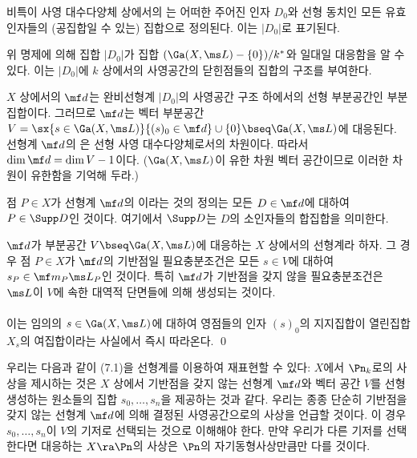 	
	\begin{definition}
	비특이 사영 대수다양체 상에서의 는
	어떠한 주어진 인자 $D_0$와 선형 동치인 모든 유효인자들의 (공집합일 수 있는) 집합으로 정의된다. 이는 $|D_0|$로 표기된다.
	\end{definition}
	
	위 명제에 의해 집합 $|D_0|$가 집합 $(\Ga(X,\ms L)-\{0\})/k^*$와 일대일 대응함을 알 수 있다.
	이는 $|D_0|$에 $k$ 상에서의 사영공간의 닫힌점들의 집합의 구조를 부여한다.
	
	
	\begin{definition}
	$X$ 상에서의  $\mf d$는 완비선형계 $|D_0|$의 사영공간 구조 하에서의 선형 부분공간인 부분집합이다.
	그러므로 $\mf d$는 벡터 부분공간 $V=\sx{s\in\Ga(X,\ms L)}{(s)_0\in\mf d}\cup\{0\}\bseq\Ga(X,\ms L)$에 대응된다.
	선형계 $\mf d$의 은 선형 사영 대수다양체로서의 차원이다. 따라서 $\dim\mf d=\dim V-1$이다.
	($\Ga(X,\ms L)$이 유한 차원 벡터 공간이므로 이러한 차원이 유한함을 기억해 두라.)
	\end{definition}
	
	
	\begin{definition}
	점 $P\in X$가 선형계 $\mf d$의 이라는 것의 정의는 모든 $D\in\mf d$에 대하여 $P\in\Supp D$인 것이다.
	여기에서 $\Supp D$는 $D$의 소인자들의 합집합을 의미한다.
	\end{definition}
	
	
	\begin{lemma}
	$\mf d$가 부분공간 $V\bseq\Ga(X,\ms L)$에 대응하는 $X$ 상에서의 선형계라 하자.
	그 경우 점 $P\in X$가 $\mf d$의 기반점일 필요충분조건은 모든 $s\in V$에 대하여 $s_P\in\mf m_P\ms L_P$인 것이다.
	특히 $\mf d$가 기반점을 갖지 않을 필요충분조건은 $\ms L$이 $V$에 속한 대역적 단면들에 의해 생성되는 것이다.\\\\
	\pf 이는 임의의 $s\in\Ga(X,\ms L)$에 대하여 영점들의 인자 $(s)_0$의 지지집합이
	열린집합 $X_s$의 여집합이라는 사실에서 즉시 따라온다.
	\qed
	\end{lemma}
	
	
	\begin{remark}
	우리는 다음과 같이 (7.1)을 선형계를 이용하여 재표현할 수 있다:
	$X$에서 $\Pn_k$로의 사상을 제시하는 것은 $X$ 상에서 기반점을 갖지 않는 선형계 $\mf d$와
	벡터 공간 $V$를 선형생성하는 원소들의 집합 $s_0,\ldots,s_n$을 제공하는 것과 같다.
	우리는 종종 단순히 기반점을 갖지 않는 선형계 $\mf d$에 의해 결정된 사영공간으로의 사상을 언급할 것이다.
	이 경우 $s_0,\ldots,s_n$이 $V$의 기저로 선택되는 것으로 이해해야 한다.
	만약 우리가 다른 기저를 선택한다면 대응하는 $X\ra\Pn$의 사상은 $\Pn$의 자기동형사상만큼만 다를 것이다.
	\end{remark}
	
